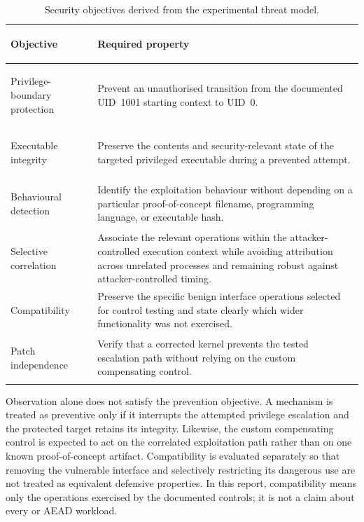 \begin{table}[H]
    \centering
    \caption{Security objectives derived from the experimental threat model.}
    \label{tab:security-objectives}
    \small
    \begin{tabularx}{\textwidth}{@{}>{\bfseries\raggedright\arraybackslash}p{}Y@{}}
        \toprule
        Objective & Required property \\
        \midrule
        Privilege-boundary protection &
        Prevent an unauthorised transition from the documented UID~1001
        starting context to UID~0. \\

        Executable integrity &
        Preserve the contents and security-relevant state of the targeted
        privileged executable during a prevented attempt. \\

        Behavioural detection &
        Identify the exploitation behaviour without depending on a particular
        proof-of-concept filename, programming language, or executable hash. \\

        Selective correlation &
        Associate the relevant operations within the attacker-controlled
        execution context while avoiding attribution across unrelated
        processes and remaining robust against attacker-controlled timing. \\

        Compatibility &
        Preserve the specific benign interface operations selected for control
        testing and state clearly which wider functionality was not exercised. \\

        Patch independence &
        Verify that a corrected kernel prevents the tested escalation path
        without relying on the custom compensating control. \\
        \bottomrule
    \end{tabularx}
\end{table}

Observation alone does not satisfy the prevention objective. A mechanism is
treated as preventive only if it interrupts the attempted privilege escalation
and the protected target retains its integrity. Likewise, the custom
compensating control is expected to act on the correlated exploitation path
rather than on one known proof-of-concept artifact. Compatibility is evaluated
separately so that removing the vulnerable interface and selectively
restricting its dangerous use are not treated as equivalent defensive
properties. In this report, compatibility means only the operations exercised
by the documented controls; it is not a claim about every  or AEAD
workload.

